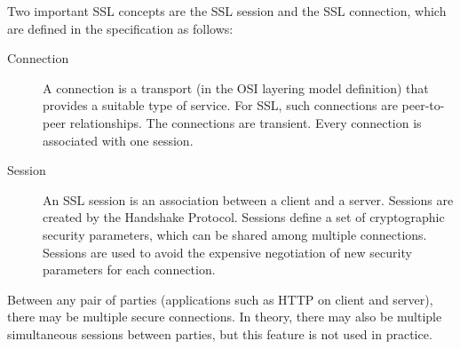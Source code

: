 \documentclass[12pt]{article}
\begin{document}
Two important SSL concepts are the SSL session and the SSL connection, which are defined in the specification as follows:
\begin{description}
\item[Connection] A connection is a transport (in the OSI layering model definition) that provides a suitable type of service. For SSL, such connections are peer-to-peer relationships. The connections are transient. Every connection is associated with one session.
\item[Session] An SSL session is an association between a client and a server. Sessions are created by the Handshake Protocol. Sessions define a set of cryptographic security parameters, which can be shared among multiple connections. Sessions are used to avoid the expensive negotiation of new security parameters for each connection.
\end{description}
Between any pair of parties (applications such as HTTP on client and server), there may be multiple secure connections. In theory, there may also be multiple simultaneous sessions between parties, but this feature is not used in practice.
\end{document}
